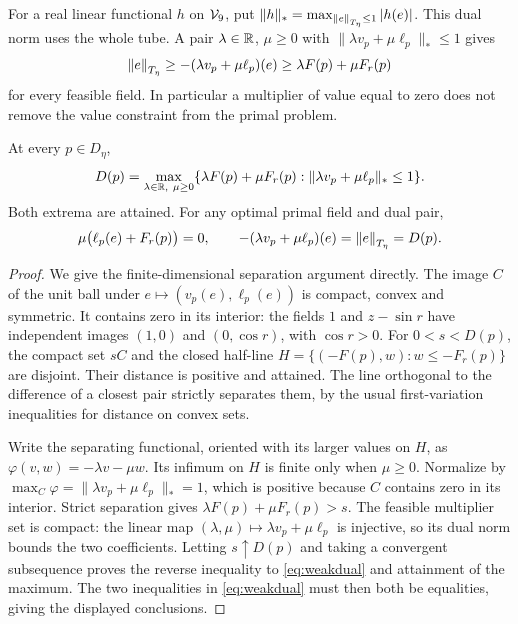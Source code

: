 \documentclass[11pt,a4paper]{article}
\begin{document}
For a real linear functional $h$ on $\mathcal V_9$, put
$\|h\|_* =\max_{\left\lVert e\right\rVert_{T_\eta}\le1}|h(e)|$. This dual norm uses the whole
tube. A pair $\lambda\in\mathbb R$, $\mu\ge0$ with
$\|\lambda v_p+\mu\ell_p\|_*\le1$ gives
\begin{equation}\label{eq:weakdual}
 \left\lVert e\right\rVert_{T_\eta}\ge-(\lambda v_p+\mu\ell_p)(e)
              \ge\lambda F(p)+\mu F_r(p)
\end{equation}
for every feasible field. In particular a multiplier of value equal to
zero does not remove the value constraint from the primal problem.

\begin{proposition}\label{prop:dual}
At every $p\in D_\eta$,
\begin{equation}\label{eq:dualmax}
 D(p)=\max_{\lambda\in\mathbb R,\ \mu\ge0}
 \{\lambda F(p)+\mu F_r(p):
                  \|\lambda v_p+\mu\ell_p\|_*\le1\}.
\end{equation}
Both extrema are attained. For any optimal primal field and dual pair,
\[
 \mu\bigl(\ell_p(e)+F_r(p)\bigr)=0,\qquad
 -(\lambda v_p+\mu\ell_p)(e)=\left\lVert e\right\rVert_{T_\eta}=D(p).
\]
\end{proposition}
\begin{proof}
We give the finite-dimensional separation argument directly.
The image $C$ of the unit ball under
$e\mapsto(v_p(e),\ell_p(e))$ is compact, convex and symmetric. It
contains zero in its interior: the fields $1$ and $z-\sin r$ have
independent images $(1,0)$ and $(0,\cos r)$, with $\cos r>0$.
For $0<s<D(p)$, the compact set $sC$ and the closed half-line
$H=\{(-F(p),w):w\le-F_r(p)\}$ are disjoint. Their distance is
positive and attained. The line orthogonal to the difference of a
closest pair strictly separates them, by the usual first-variation
inequalities for distance on convex sets.

Write the separating functional, oriented with its larger values on
$H$, as $\varphi(v,w)=-\lambda v-\mu w$. Its infimum on $H$ is
finite only when $\mu\ge0$. Normalize by
$\max_C\varphi=\|\lambda v_p+\mu\ell_p\|_*=1$, which is
positive because $C$ contains zero in its interior. Strict separation
gives $\lambda F(p)+\mu F_r(p)>s$. The feasible multiplier set is
compact: the linear map $(\lambda,\mu)\mapsto\lambda v_p+\mu\ell_p$
is injective, so its dual norm bounds the two coefficients. Letting
$s\uparrow D(p)$ and taking a convergent subsequence proves the reverse
inequality to \eqref{eq:weakdual} and attainment of the maximum.
The two inequalities in \eqref{eq:weakdual} must then both be equalities,
giving the displayed conclusions.
\end{proof}
\end{document}
